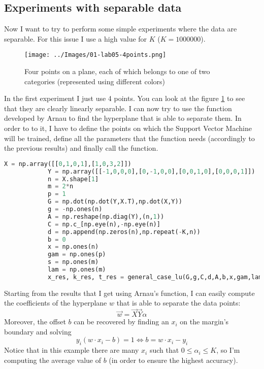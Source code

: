     \subsection{Experiments with separable data}
        Now I want to try to perform some simple experiments where the data are separable. For this issue I use a high value for \(K\) (\(K=1000000\)).\par
        \begin{figure}
            \centering
            \texttt{[image: ../Images/01-lab05-4points.png]}
            \caption{Four points on a plane, each of which belongs to one of two categories (represented using different colors)}
            \label{01-lab05-4points}
        \end{figure}
        In the first experiment I just use 4 points. You can look at the figure \ref{01-lab05-4points} to see that they are clearly linearly separable. I can now try to use the function developed by Arnau to find the hyperplane that is able to separate them. In order to to it, I have to define the points on which the Support Vector Machine will be trained, define all the parameters that the function needs (accordingly to the previous results) and finally call the function.
        \begin{lstlisting}[language=Python]
            X = np.array([[0,1,0,1],[1,0,3,2]])
            Y = np.array([[-1,0,0,0],[0,-1,0,0],[0,0,1,0],[0,0,0,1]])
            n = X.shape[1]
            m = 2*n
            p = 1
            G = np.dot(np.dot(Y,X.T),np.dot(X,Y))
            g = -np.ones(n)
            A = np.reshape(np.diag(Y),(n,1))
            C = np.c_[np.eye(n),-np.eye(n)]
            d = np.append(np.zeros(n),np.repeat(-K,n))
            b = 0
            x = np.ones(n)
            gam = np.ones(p)
            s = np.ones(m)
            lam = np.ones(m)
            x_res, k_res, t_res = general_case_lu(G,g,C,d,A,b,x,gam,lam,s)
        \end{lstlisting}
        Starting from the results that I get using Arnau's function, I can easily compute the coefficients of the hyperplane \(w\) that is able to separate the data points:
        \[\vec{w} = \vec{X}\vec{Y}\alpha\]
        Moreover, the offset \(b\) can be recovered by finding an \(x_i\) on the margin's boundary and solving
        \[y_i(w\cdot x_i - b)=1 \iff b = w\cdot x_i - y_i\]
        Notice that in this example there are many \(x_i\) such that \(0\leq\alpha_i\leq K\), so I'm computing the average value of \(b\) (in order to ensure the highest accuracy).
